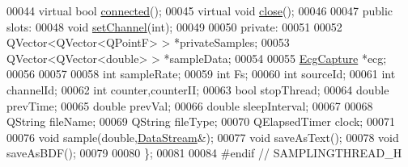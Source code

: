 \begin{DoxyCode}
00044     \textcolor{keyword}{virtual} \textcolor{keywordtype}{bool} \hyperlink{classSamplingThread_a0770f5d1d0c0160cf023fae294010961}{connected}(); 
00045     \textcolor{keyword}{virtual} \textcolor{keywordtype}{void} \hyperlink{classSamplingThread_aade561b442e580b0ca4af112de2d7a41}{close}(); 
00046 
00047 \textcolor{keyword}{public} slots:
00048     \textcolor{keywordtype}{void} \hyperlink{classSamplingThread_ad97231cf2bf7bbf0d1273b2076a18bab}{setChannel}(\textcolor{keywordtype}{int});
00049 
00050 \textcolor{keyword}{private}:
00051 
00052     QVector<QVector<QPointF> > *privateSamples;
00053     QVector<QVector<double> > *sampleData;
00054 
00055     \hyperlink{classEcgCapture}{EcgCapture} *ecg;
00056 
00057 
00058     \textcolor{keywordtype}{int} sampleRate;
00059     \textcolor{keywordtype}{int} Fs;
00060     \textcolor{keywordtype}{int} sourceId;
00061     \textcolor{keywordtype}{int} channelId;
00062     \textcolor{keywordtype}{int} counter,counterII;
00063     \textcolor{keywordtype}{bool} stopThread;
00064     \textcolor{keywordtype}{double} prevTime;
00065     \textcolor{keywordtype}{double} prevVal;
00066     \textcolor{keywordtype}{double} sleepInterval;
00067 
00068     QString fileName;
00069     QString fileType;
00070     QElapsedTimer clock;
00071 
00076     \textcolor{keywordtype}{void} sample(\textcolor{keywordtype}{double},\hyperlink{classDataStream}{DataStream}&);
00077     \textcolor{keywordtype}{void} saveAsText();
00078     \textcolor{keywordtype}{void} saveAsBDF();
00079 
00080 \};
00081 
00084 \textcolor{preprocessor}{#endif // SAMPLINGTHREAD\_H}
\end{DoxyCode}

